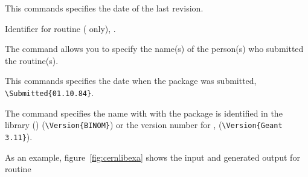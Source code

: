 
This commands specifies the date of the last revision.


Identifier for routine (\GEANT{} only), \eg {}.


The  command allows you to specify the name(s)
of the person(s) who submitted the routine(s).


This commands specifies the date when the package was submitted,
\eg \verb!\Submitted{01.10.84}!.


The  command specifies the name
with with the package is identified in the library (\CERNLIB)
(\eg \verb!\Version{BINOM}!) or the version number for \GEANT{}, 
(\eg \verb!\Version{Geant 3.11}!).

As an example, figure~\vref{fig:cernlibexa} shows 
the input and generated output for \CERNLIB{} routine 

